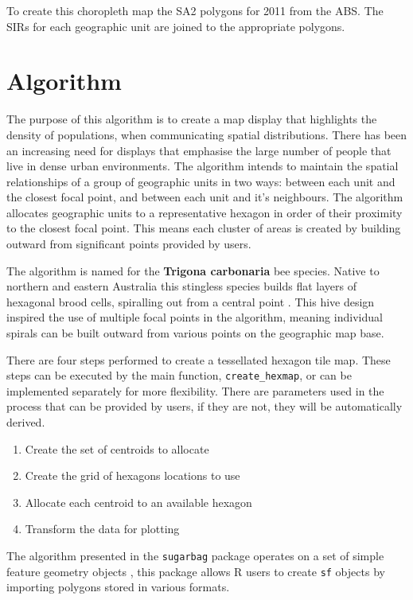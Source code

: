 \documentclass{monashthesis}
\begin{document}
To create this choropleth map the SA2 polygons for 2011 from the ABS. The SIRs for each geographic unit are joined to the appropriate polygons.

\hypertarget{algorithm-1}{%
\section{Algorithm}\label{algorithm-1}}

The purpose of this algorithm is to create a map display that highlights the density of populations, when communicating spatial distributions. There has been an increasing need for displays that emphasise the large number of people that live in dense urban environments. The algorithm intends to maintain the spatial relationships of a group of geographic units in two ways: between each unit and the closest focal point, and between each unit and it's neighbours. The algorithm allocates geographic units to a representative hexagon in order of their proximity to the closest focal point. This means each cluster of areas is created by building outward from significant points provided by users.

The algorithm is named for the \textbf{Trigona carbonaria} bee species. Native to northern and eastern Australia this stingless species builds flat layers of hexagonal brood cells, spiralling out from a central point \autocite{PH}. This hive design inspired the use of multiple focal points in the algorithm, meaning individual spirals can be built outward from various points on the geographic map base.

There are four steps performed to create a tessellated hexagon tile map.
These steps can be executed by the main function, \texttt{create\_hexmap}, or can be implemented separately for more flexibility. There are parameters used in the process that can be provided by users, if they are not, they will be automatically derived.

\begin{enumerate}
\def\labelenumi{\arabic{enumi}.}
\tightlist
\item
  Create the set of centroids to allocate
\item
  Create the grid of hexagons locations to use
\item
  Allocate each centroid to an available hexagon
\item
  Transform the data for plotting
\end{enumerate}

The algorithm presented in the \texttt{sugarbag} package operates on a set of simple feature geometry objects \autocite{sf}, this package allows R users to create \texttt{sf} objects by importing polygons stored in various formats.
\end{document}
